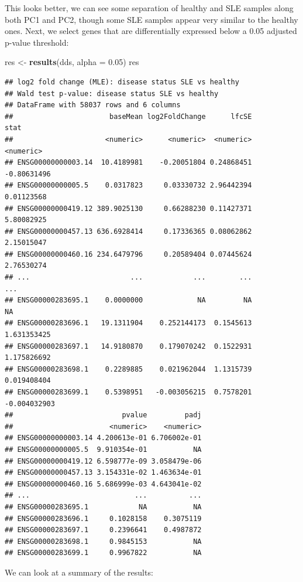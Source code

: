 \documentclass[9pt,a4paper,]{extarticle}
\newenvironment{Shaded}{\begin{snugshade}}{\end{snugshade}}
\newcommand{\KeywordTok}[1]{\textcolor[rgb]{0.13,0.29,0.53}{\textbf{#1}}}
\newcommand{\DataTypeTok}[1]{\textcolor[rgb]{0.13,0.29,0.53}{#1}}
\newcommand{\FloatTok}[1]{\textcolor[rgb]{0.00,0.00,0.81}{#1}}
\newcommand{\StringTok}[1]{\textcolor[rgb]{0.31,0.60,0.02}{#1}}
\newcommand{\NormalTok}[1]{#1}
\begin{document}
This looks better, we can see some separation of healthy and SLE samples along both PC1 and PC2, though some SLE samples appear very similar to the healthy ones.
Next, we select genes that are differentially expressed below a 0.05 adjusted p-value threshold:

\begin{Shaded}
\begin{Highlighting}[]
\NormalTok{res <-}\StringTok{ }\KeywordTok{results}\NormalTok{(dds, }\DataTypeTok{alpha =} \FloatTok{0.05}\NormalTok{)}
\NormalTok{res}
\end{Highlighting}
\end{Shaded}

\begin{verbatim}
## log2 fold change (MLE): disease status SLE vs healthy 
## Wald test p-value: disease status SLE vs healthy 
## DataFrame with 58037 rows and 6 columns
##                       baseMean log2FoldChange      lfcSE         stat
##                      <numeric>      <numeric>  <numeric>    <numeric>
## ENSG00000000003.14  10.4189981    -0.20051804 0.24868451  -0.80631496
## ENSG00000000005.5    0.0317823     0.03330732 2.96442394   0.01123568
## ENSG00000000419.12 389.9025130     0.66288230 0.11427371   5.80082925
## ENSG00000000457.13 636.6928414     0.17336365 0.08062862   2.15015047
## ENSG00000000460.16 234.6479796     0.20589404 0.07445624   2.76530274
## ...                        ...            ...        ...          ...
## ENSG00000283695.1    0.0000000             NA         NA           NA
## ENSG00000283696.1   19.1311904    0.252144173  0.1545613  1.631353425
## ENSG00000283697.1   14.9180870    0.179070242  0.1522931  1.175826692
## ENSG00000283698.1    0.2289885    0.021962044  1.1315739  0.019408404
## ENSG00000283699.1    0.5398951   -0.003056215  0.7578201 -0.004032903
##                          pvalue         padj
##                       <numeric>    <numeric>
## ENSG00000000003.14 4.200613e-01 6.706002e-01
## ENSG00000000005.5  9.910354e-01           NA
## ENSG00000000419.12 6.598777e-09 3.058479e-06
## ENSG00000000457.13 3.154331e-02 1.463634e-01
## ENSG00000000460.16 5.686999e-03 4.643041e-02
## ...                         ...          ...
## ENSG00000283695.1            NA           NA
## ENSG00000283696.1     0.1028158    0.3075119
## ENSG00000283697.1     0.2396641    0.4987872
## ENSG00000283698.1     0.9845153           NA
## ENSG00000283699.1     0.9967822           NA
\end{verbatim}

We can look at a summary of the results:
\end{document}
